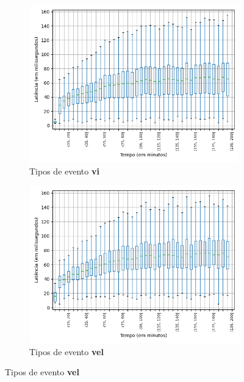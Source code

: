 \begin{figure}
\begin{subfigure}{.5\textwidth}
\centering
\includegraphics[width=\textwidth]{figuras/graphics/boxplot_8-dez-su_vi.png}
\caption{Tipos de evento \textbf{vi}}
\label{fig:BoxPlot_vi_SU_8-dez-su}
\end{subfigure}%
\centering
\begin{subfigure}{.5\textwidth}
\centering
\includegraphics[width=\textwidth]{figuras/graphics/boxplot_8-dez-su_vel.png}
\caption{Tipos de evento \textbf{vel}}
\label{fig:BoxPlot_vel_SU_8-dez-su}
\end{subfigure}%


\end{figure}
